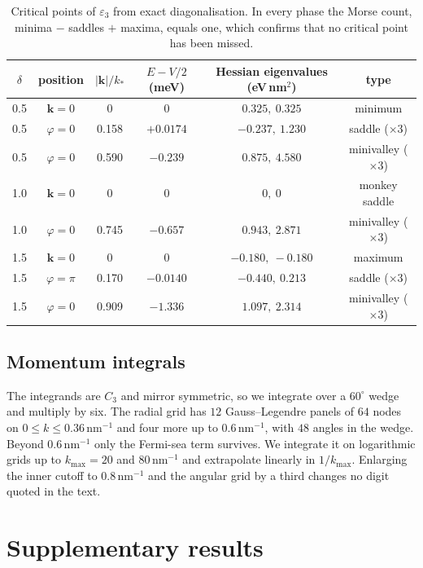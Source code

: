 \documentclass[12pt,a4paper]{article}
\newcommand{\bk}{\mathbf{k}}
\newcommand{\nm}{\,\mathrm{nm}}
\begin{document}
\begin{table}[h]
\centering
\caption{Critical points of $\varepsilon_3$ from exact diagonalisation. In every phase the Morse count, minima $-$ saddles $+$ maxima, equals one, which confirms that no critical point has been missed.}
\label{tab:crit}
\small
\begin{tabular}{cccccc}
\toprule
$\delta$ & position & $|\bk|/k_*$ & $E-V/2$ (meV) & Hessian eigenvalues (eV\,nm$^2$) & type \\
\midrule
0.5 & $\bk=0$ & 0 & 0 & $0.325,\ 0.325$ & minimum\\
0.5 & $\varphi=0$ & 0.158 & $+0.0174$ & $-0.237,\ 1.230$ & saddle ($\times3$)\\
0.5 & $\varphi=0$ & 0.590 & $-0.239$ & $0.875,\ 4.580$ & minivalley ($\times3$)\\
1.0 & $\bk=0$ & 0 & 0 & $0,\ 0$ & monkey saddle\\
1.0 & $\varphi=0$ & 0.745 & $-0.657$ & $0.943,\ 2.871$ & minivalley ($\times3$)\\
1.5 & $\bk=0$ & 0 & 0 & $-0.180,\ -0.180$ & maximum\\
1.5 & $\varphi=\pi$ & 0.170 & $-0.0140$ & $-0.440,\ 0.213$ & saddle ($\times3$)\\
1.5 & $\varphi=0$ & 0.909 & $-1.336$ & $1.097,\ 2.314$ & minivalley ($\times3$)\\
\bottomrule
\end{tabular}
\end{table}

\subsection{Momentum integrals}

The integrands are $C_3$ and mirror symmetric, so we integrate over a $60^\circ$ wedge and multiply by six. The radial grid has $12$ Gauss--Legendre panels of $64$ nodes on $0\le k\le0.36\nm^{-1}$ and four more up to $0.6\nm^{-1}$, with $48$ angles in the wedge. Beyond $0.6\nm^{-1}$ only the Fermi-sea term survives. We integrate it on logarithmic grids up to $k_{\max}=20$ and $80\nm^{-1}$ and extrapolate linearly in $1/k_{\max}$. Enlarging the inner cutoff to $0.8\nm^{-1}$ and the angular grid by a third changes no digit quoted in the text.

\section{Supplementary results}\label{app:supp}
\end{document}
